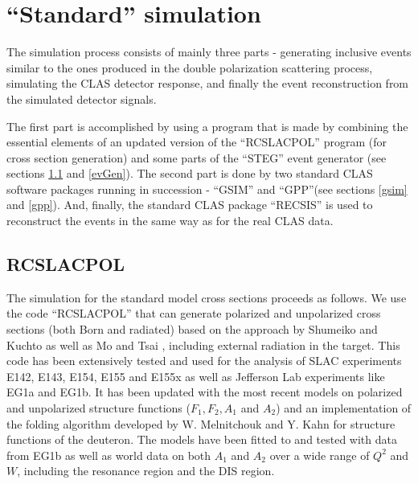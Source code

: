 
\hspace{0.5cm}


\section{``Standard'' simulation}
\label{stand}

The simulation process consists of mainly three parts - generating inclusive events similar to the ones %
produced in the double polarization scattering process, simulating the CLAS detector response, and finally the event reconstruction from %
the simulated detector signals.

The first part is accomplished by using a program that is made by combining the essential elements of an updated version of the ``RCSLACPOL'' program (for cross section generation) and some parts of the ``STEG'' event generator (see sections \ref{rcslacpol} and \ref{evGen}). The second part is done by two standard CLAS software packages running in succession - ``GSIM'' and ``GPP''(see sections \ref{gsim} and \ref{gpp}). And, finally, the %
standard CLAS package ``RECSIS'' is used to reconstruct the events in the same way as for the real CLAS data.


\subsection{RCSLACPOL}
\label{rcslacpol}
The simulation for the standard model cross sections %
proceeds as follows. We use the code ``RCSLACPOL'' \cite{PolNit:ref} %
that can generate polarized and unpolarized cross sections (both Born and radiated) based on the %
approach by Shumeiko and Kuchto \cite{Kuchto:ref} as well as Mo and Tsai \cite{MoTsai:ref}, including external radiation in the target. This code has been extensively tested and used for the analysis of SLAC experiments E142, E143, E154, E155 and E155x %
as well as Jefferson Lab experiments like EG1a and EG1b. %
It has been updated with the most recent models on polarized and unpolarized structure functions ($F_1, F_2, A_1$ and $A_2$) \cite{Bosted:2007xd,PolNit:ref,EG1bProt,EG1bDeut} %
and an implementation of the folding algorithm developed by W. Melnitchouk and Y. Kahn \cite{KahnEtal} for structure functions of the deuteron. The models have been fitted to and tested with data from EG1b as well as world data on both $A_1$ and $A_2$ over a wide range of $Q^2$ and $W$, including the resonance region and the DIS region.

